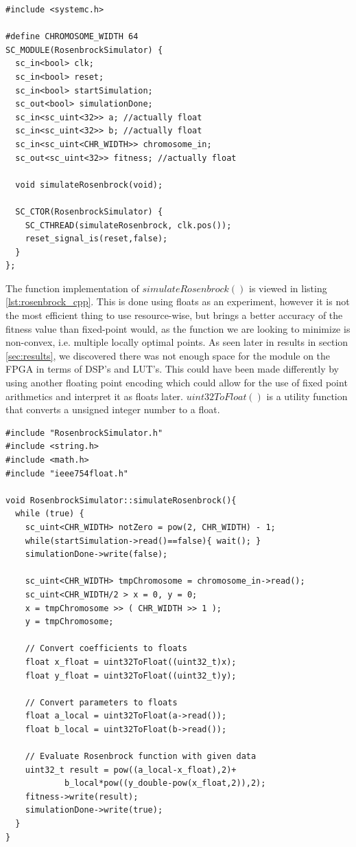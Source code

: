 \begin{lstlisting}[style=customc++,caption={RosenbrockSimulator.h},label={lst:rosenbrock_h}]
#include <systemc.h>

#define CHROMOSOME_WIDTH 64
SC_MODULE(RosenbrockSimulator) {
  sc_in<bool> clk;
  sc_in<bool> reset;
  sc_in<bool> startSimulation;
  sc_out<bool> simulationDone;
  sc_in<sc_uint<32>> a; //actually float
  sc_in<sc_uint<32>> b; //actually float
  sc_in<sc_uint<CHR_WIDTH>> chromosome_in;
  sc_out<sc_uint<32>> fitness; //actually float

  void simulateRosenbrock(void);

  SC_CTOR(RosenbrockSimulator) {
    SC_CTHREAD(simulateRosenbrock, clk.pos());
    reset_signal_is(reset,false);
  }
};
\end{lstlisting}

The function implementation of $simulateRosenbrock()$ is viewed in listing \ref{lst:rosenbrock_cpp}. This is done using floats as an experiment, however it is not the most efficient thing to use resource-wise, but brings a better accuracy of the fitness value than fixed-point would, as the function we are looking to minimize is non-convex, i.e. multiple locally optimal points. As seen later in results in section \ref{sec:results}, we discovered there was not enough space for the module on the FPGA in terms of DSP's and LUT's. This could have been made differently by using another floating point encoding which could allow for the use of fixed point arithmetics and interpret it as floats later. $uint32ToFloat()$ is a utility function that converts a unsigned integer number to a float.

\begin{lstlisting}[style=customc++,caption={RosenbrockSimulator.cpp},label={lst:rosenbrock_cpp}]
#include "RosenbrockSimulator.h"
#include <string.h>
#include <math.h>
#include "ieee754float.h"

void RosenbrockSimulator::simulateRosenbrock(){
  while (true) {
    sc_uint<CHR_WIDTH> notZero = pow(2, CHR_WIDTH) - 1;
    while(startSimulation->read()==false){ wait(); }
    simulationDone->write(false);
    
    sc_uint<CHR_WIDTH> tmpChromosome = chromosome_in->read();
    sc_uint<CHR_WIDTH/2 > x = 0, y = 0;
    x = tmpChromosome >> ( CHR_WIDTH >> 1 );
    y = tmpChromosome;
    
    // Convert coefficients to floats
    float x_float = uint32ToFloat((uint32_t)x);
   	float y_float = uint32ToFloat((uint32_t)y);
   	
   	// Convert parameters to floats
   	float a_local = uint32ToFloat(a->read());
   	float b_local = uint32ToFloat(b->read());
   
   	// Evaluate Rosenbrock function with given data
    uint32_t result = pow((a_local-x_float),2)+
    		b_local*pow((y_double-pow(x_float,2)),2);
    fitness->write(result);
    simulationDone->write(true);
  }
}
\end{lstlisting}


